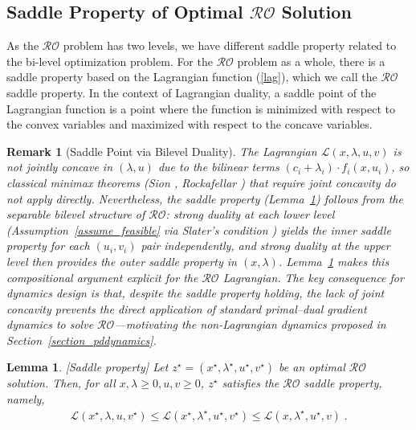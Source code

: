 \documentclass[journal,twoside,web]{ieeecolor}
\newcommand{\rev}[1]{#1}
\newtheorem{lemma}{Lemma}
\newtheorem{remark}{Remark}
\begin{document}
\subsection*{Saddle Property of Optimal $\mathcal{RO}$ Solution}

As the $\mathcal{RO}$ problem has two levels, we have different saddle property related to the bi-level optimization problem. For the $\mathcal{RO}$ problem as a whole, there is a saddle property based on the Lagrangian function (\ref{lag}), which we call the $\mathcal{RO}$ saddle property. In the context of Lagrangian duality, a saddle point of the Lagrangian function is a point where the function is minimized with respect to the convex variables and maximized with respect to the concave variables.

\begin{remark}[\rev{Saddle Point via Bilevel Duality}]
\rev{The Lagrangian $\mathcal{L}(x,\lambda,u,v)$ is not jointly concave
in $(\lambda,u)$ due to the bilinear terms
$(c_i+\lambda_i)\cdot f_i(x,u_i)$, so classical minimax theorems
(Sion \cite{sion1958}, Rockafellar \cite{rockafellar1970}) that
require joint concavity do not apply directly.  Nevertheless, the
saddle property (Lemma~\ref{saddle.lem}) follows from the separable
bilevel structure of $\mathcal{RO}$: strong duality at each lower
level (Assumption~\ref{assume_feasible} via Slater's condition
\cite[Section~5.2.3]{boyd2004}) yields the inner saddle property for
each $(u_i, v_i)$ pair independently, and strong duality at the upper
level then provides the outer saddle property in
$(x,\lambda)$.  Lemma~\ref{saddle.lem} makes this compositional
argument explicit for the $\mathcal{RO}$ Lagrangian.  The key
consequence for dynamics design is that, despite the saddle property
holding, the lack of joint concavity prevents the direct application
of standard primal--dual gradient dynamics
\cite{arrow1958,feijer2010,cherukuri2016} to solve
$\mathcal{RO}$---motivating the non-Lagrangian dynamics proposed in
Section~\ref{section_pddynamics}.}
\end{remark}

\begin{lemma} \label{saddle.lem} [Saddle property]
Let $z^\star=(x^\star,\lambda^\star,u^\star,v^\star)$ be an optimal $\mathcal{RO}$ solution. Then, for all $x,\lambda\geq 0,u,v\geq 0$\;, $z^\star$ satisfies the $\mathcal{RO}$ saddle property, namely,
\begin{align} \label{saddle}
\mathcal{L}(x^\star,\lambda,u,v^\star)\leq \mathcal{L}(x^\star,\lambda^\star,u^\star,v^\star)\leq \mathcal{L}(x,\lambda^\star,u^\star,v)\;.
\end{align}
\end{lemma}
\end{document}
